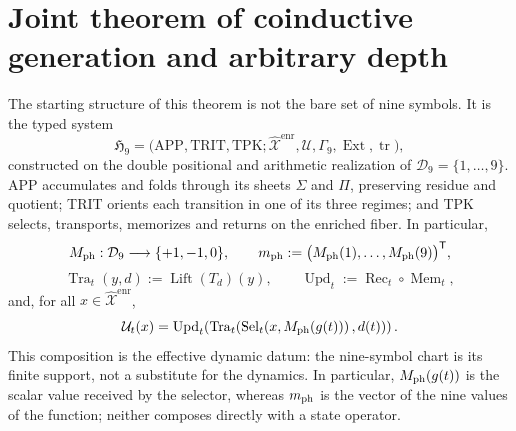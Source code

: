 
\section{Joint theorem of coinductive generation and arbitrary depth}
\label{sec:c27-generacion-coinductiva-profundidad-arbitraria}

The starting structure of this theorem is not the bare set of nine
symbols. It is the typed system
\[
 \mathfrak H_9=
 \bigl(\mathrm{APP},\mathrm{TRIT},\mathrm{TPK};
       \widehat{\mathcal X}^{\mathrm{enr}},\mathcal U,
       \Gamma_9,\operatorname{Ext},\operatorname{tr}\bigr),
\]
constructed on the double positional and arithmetic realization of
\(\mathcal D_9=\{1,\ldots,9\}\). APP accumulates and folds through its sheets
\(\Sigma\) and \(\Pi\), preserving residue and quotient; TRIT orients each
transition in one of its three regimes; and TPK selects, transports,
memorizes and returns on the enriched fiber. In particular,
\[
 M_{\rm ph}:\mathcal D_9\longrightarrow\{+1,-1,0\},
 \qquad
 m_{\rm ph}:=\bigl(M_{\rm ph}(1),\ldots,M_{\rm ph}(9)\bigr)^{\mathsf T},
\]
\[
 \operatorname{Tra}_t(y,d):=\operatorname{Lift}(T_d)(y),
 \qquad
 \operatorname{Upd}_t:=\operatorname{Rec}_t\circ\operatorname{Mem}_t,
\]
and, for all \(x\in\widehat{\mathcal X}^{\mathrm{enr}}\),
\[
 \mathcal U_t(x)
 =\operatorname{Upd}_t\!\left(
   \operatorname{Tra}_t\!\left(
    \operatorname{Sel}_t\!\left(x,M_{\rm ph}(g(t))\right),d(t)
   \right)\right).
\]
This composition is the effective dynamic datum: the nine-symbol chart
is its finite support, not a substitute for the dynamics. In particular,
\(M_{\rm ph}(g(t))\) is the scalar value received by the selector, whereas
\(m_{\rm ph}\) is the vector of the nine values of the function; neither
composes directly with a state operator.


